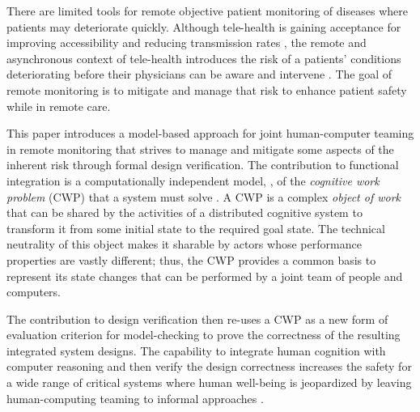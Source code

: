 There are limited tools for remote objective patient monitoring of diseases where patients may deteriorate quickly. Although tele-health is gaining acceptance for improving accessibility and reducing transmission rates \cite{10.1093/jamia/ocaa048,telehealth,10.1093/jamia/ocaa067}, the remote and asynchronous context of tele-health introduces the risk of a patients' conditions deteriorating before their physicians can be aware and intervene \cite{10.1097/ALN.0000000000003578}. The goal of remote monitoring is to mitigate and manage that risk to enhance patient safety while in remote care. 

\begin{comment}
  Remote patient monitoring relies on clinicians, health IT, patients-caregivers, and other concurrent actors to each reliably perform various asynchronous tasks to coordinate patient care and safety \cite{remote,Aalam229}. Designing such systems becomes complex quickly because actors are outside the direct control of the system. These distributed and asynchronous characteristics make manual reasoning about functional integration and safety early in the design process very difficult; and yet, early in the design process is exactly the time to clearly establish the utility of the design in fulfilling its intended purpose. 
\end{comment}

This paper introduces a model-based approach for joint human-computer teaming in remote monitoring 
that strives to manage and mitigate some aspects of the inherent risk through formal design verification. The contribution to functional integration is a computationally independent model, \cite{garrido}, of the \emph{cognitive work problem} (CWP) that a system must solve \cite{workflowmodel,workcentered,BERRY201615,chi2010}.  A CWP is a complex \emph{object of work} that can be shared by the activities of a distributed cognitive system to transform it from some initial state to the required goal state. The technical neutrality of this object makes it sharable by actors whose performance properties are vastly different; thus, the CWP provides a common basis to represent its state changes that can be performed by a joint team of people and computers. 

The contribution to design verification then re-uses a CWP as a new form of evaluation criterion for model-checking to prove the correctness of the resulting integrated system designs. The capability to integrate human cognition with computer reasoning and then verify the design correctness increases the safety for a wide range of critical systems where human well-being is jeopardized by leaving human-computing teaming to informal approaches \cite{remote,Aalam229}.

